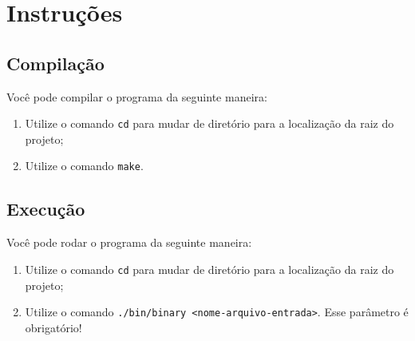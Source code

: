 \documentclass{article}
\def\code#1{\texttt{#1}}
\begin{document}
\newpage
\section*{Instruções}

\subsection*{Compilação}

Você pode compilar o programa da seguinte maneira:

\begin{enumerate}
    \item Utilize o comando \code{cd} para mudar de diretório para a localização da raiz do projeto;
    \item Utilize o comando \code{make}. 
\end{enumerate}

\subsection*{Execução}

Você pode rodar o programa da seguinte maneira:

\begin{enumerate}
    \item Utilize o comando \code{cd} para mudar de diretório para a localização da raiz do projeto;
    \item Utilize o comando \code{./bin/binary <nome-arquivo-entrada>}. Esse parâmetro é obrigatório!
\end{enumerate}
\end{document}
